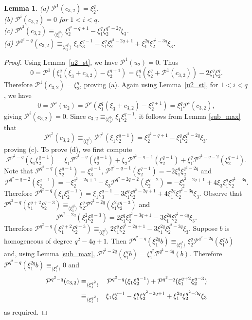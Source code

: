 \documentclass{amsart}
\newcommand{\PP}{\mathcal{P}}
\newtheorem{lem}[subsection]{Lemma}
\begin{document}
\begin{lem} \label{c22_st} (a) $\PP^1(c_{3,2})=\xi_2^q$.\\
 (b) $\PP^i(c_{3,2})=0$ for $1<i<q$.\\
 (c) $\PP^{q^2}(c_{3,2})\equiv_{\langle\xi_1^{q^2}\rangle}\xi_2^{q^2-q+1}-\xi_1^q\xi_2^{q^2-2q}\xi_3$.\\
 (d) $\PP^{q^2-q}(c_{3,2})\equiv_{\langle\xi_1^{q^2}\rangle}\xi_1\xi_3^{q-1}-\xi_1^q\xi_2^{q^2-2q+1}+\xi_1^{2q}\xi_2^{q^2-3q}\xi_3 $.
 \end{lem}
 \begin{proof} Using Lemma~\ref{u2_st}, we have $\PP^1(u_2)=0$. Thus
 $$0=\PP^1(\xi_1^q(\xi_3+c_{3,2})-\xi_2^{q+1})=\xi_1^q(\xi_2^q+\PP^1(c_{3,2}))-2\xi_1^q\xi_2^q.$$
 Therefore $\PP^1(c_{3,2})=\xi_2^q$, proving (a).
 Again using Lemma~\ref{u2_st}, for $1<i<q$, we have 
 $$0=\PP^i(u_2)=\PP^i(\xi_1^q(\xi_3+c_{3,2})-\xi_2^{q+1})=\xi_1^q\PP^i(c_{3,2}),$$
 giving $\PP^i(c_{3,2})=0$.
  Since $c_{3,2}\equiv_{\langle\xi_1^q\rangle}\xi_1\xi_2^{q-1}$, it follows from Lemma \ref{sub_max} that
  $$\PP^{q^2}(c_{3,2})\equiv_{\langle\xi_1^{q^2}\rangle}\PP^{q^2}(\xi_1\xi_2^{q-1})=\xi_2^{q^2-q+1}-\xi_1^q\xi_2^{q^2-2q}\xi_3,$$
  proving (c).  To prove (d), we first compute 
  $$\PP^{q^2-q}(\xi_1\xi_2^{q-1})=\xi_1\PP^{q^2-q}(\xi_2^{q-1})+\xi_2\PP^{q^2-q-1}(\xi_2^{q-1})+\xi_1^q\PP^{q^2-q-2}(\xi_2^{q-1}).$$
Note that $\PP^{q^2-q}(\xi_2^{q-1})=\xi_3^{q-1}$, $\PP^{q^2-q-1}(\xi_2^{q-1})=-2\xi_1^q\xi_2^{q^2-2q}$ and
$$\PP^{q^2-q-2}(\xi_2^{q-1})=-\xi_2^{q^2-2q+1}-\xi_3\PP^{q^2-2q-2}(\xi_2^{q-2})= -\xi_2^{q^2-2q+1}+4\xi_3\xi_1^q\xi_2^{q^2-3q}.$$
Therefore $\PP^{q^2-q}(\xi_1\xi_2^{q-1})=\xi_1\xi_3^{q-1}-3\xi_1^q\xi_2^{q^2-2q+1}+4\xi_1^{2q}\xi_2^{q^2-3q}\xi_3$.
Observe that $\PP^{q^2-q}(\xi_1^{q+2}\xi_2^{q-3})\equiv_{\langle\xi_1^{q^2}\rangle} \xi_2^q\PP^{q^2-2q}(\xi_1^2\xi_2^{q-3})$
and $$\PP^{q^2-2q}(\xi_1^2\xi_2^{q-3})=2\xi_1^q\xi_2^{q^2-3q+1}-3\xi_1^{2q}\xi_2^{q^2-4q}\xi_3.$$
Therefore $\PP^{q^2-q}(\xi_1^{q+2}\xi_2^{q-3})\equiv_{\langle\xi_1^{q^2}\rangle}2\xi_1^q\xi_2^{q^2-2q+1}-3\xi_1^{2q}\xi_2^{q^2-3q}\xi_3$.
Suppose $b$ is homogeneous of degree $q^2-4q+1$. Then 
$\PP^{q^2-q}(\xi_1^{2q}b)\equiv_{\langle\xi_1^{q^2}\rangle} \xi_2^q\PP^{q^2-2q}(\xi_1^qb)$ and, using Lemma \ref{sub_max},
$\PP^{q^2-2q}(\xi_1^qb) =\xi_1^{q^2}\PP^{q^2-4q}(b)$. Therefore $\PP^{q^2-q}(\xi_1^{2q}b)\equiv_{\langle\xi_1^{q^2}\rangle} 0$
and 
\begin{eqnarray*}
\PP^{q^2-q}(c_{3,2})&\equiv_{\langle\xi_1^{q^2}\rangle}&\PP^{q^2-q}(\xi_1\xi_2^{q-1})+\PP^{q^2-q}(\xi_1^{q+2}\xi_2^{q-3})\cr
&\equiv_{\langle\xi_1^{q^2}\rangle}& \xi_1\xi_3^{q-1}-\xi_1^q\xi_2^{q^2-2q+1}+\xi_1^{2q}\xi_2^{q^2-3q}\xi_3
\end{eqnarray*}
as required. 
 \end{proof}
\end{document}
